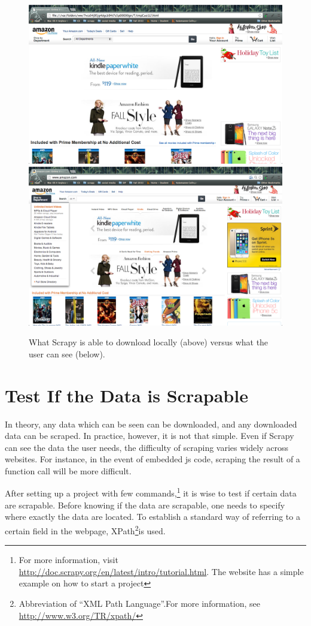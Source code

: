 \documentclass[12pt]{report}
\begin{document}
\begin{figure}[htp]
\includegraphics[width=\textwidth]{amazon_scrapy_view.png}
\includegraphics[width=\textwidth]{amazon_normal_view.png}
\caption[Comparison of views]
{What Scrapy is able to download locally (above) versus what the user can see (below).}
\end{figure}
\section{Test If the Data is Scrapable}
In theory, any data which can be seen can be downloaded, and any downloaded data can be scraped. In practice, however, it is not that simple. Even if Scrapy can see the data the user needs, the difficulty of scraping varies widely across websites. For instance, in the event of embedded \gls{js} code, scraping the result of a function call will be more difficult.

After setting up a project with few commands,\footnote{For more information, visit \url{http://doc.scrapy.org/en/latest/intro/tutorial.html}. The website has a simple example on how to start a project} it is wise to test if certain data are scrapable. Before knowing if the data are scrapable, one needs to specify where exactly the data are located. To establish a standard way of referring to a certain field in the webpage, XPath\footnote{Abbreviation of ``XML Path Language''.For more information, see \url{http://www.w3.org/TR/xpath/}}is used.
\end{document}
